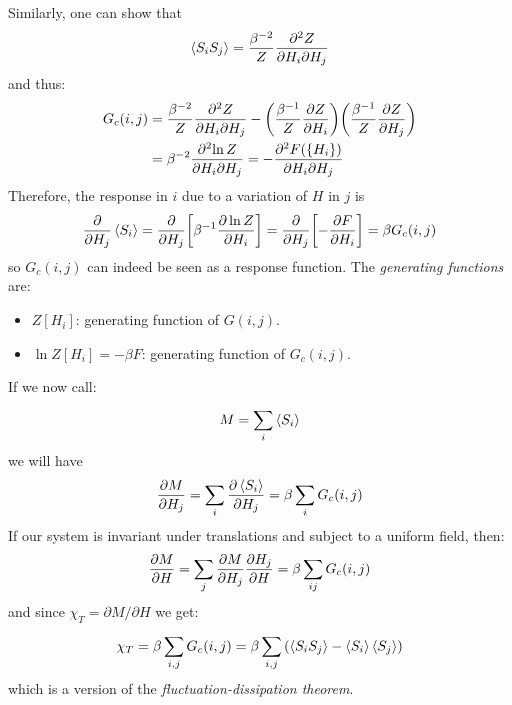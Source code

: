\documentclass[../../Main/Main.tex]{subfiles}
\begin{document}
Similarly, one can show that
\begin{equation}
  \expval{S_i S_j} = \frac{\beta ^{-2}}{Z} \frac{\partial^2{Z} }{\partial{H_i} \partial{H_j}  }
\end{equation}
and thus:
\begin{equation}
\begin{split}
  G_c (i,j) & = \frac{\beta ^{-2}}{Z}  \frac{\partial^2{Z} }{\partial{H_i} \partial{H_j}  }
  - \qty(\frac{\beta ^{-1}}{Z} \pdv{Z}{H_i} ) \qty(\frac{\beta ^{-1}}{Z} \pdv{Z}{H_j} ) \\
  & = \beta ^{-2} \frac{\partial^2{\ln{Z} } }{\partial{H_i} \partial{H_j}  }
  = - \frac{\partial^2{F(\{ H_i \}  )} }{\partial{H_i} \partial{H_j}  }
\end{split}
\end{equation}
Therefore, the response in \( i \) due to a variation of \( H \) in \( j \) is
  \begin{equation*}
    \pdv{}{H_j} \expval{S_i} = \pdv{}{H_j} \qty[\beta ^{-1} \pdv{\ln{Z} }{H_i} ]  =\pdv{}{H_j} \qty[-\pdv{F}{H_i} ] =  \beta G_c (i,j)
  \end{equation*}
  so \( G_c (i,j) \) can indeed be seen as a response function.
The \emph{generating functions} are:
\begin{itemize}
\item \( Z[H_i] \): generating function of \( G(i,j) \).
\item \( \ln{Z[H_i]} = - \beta F  \): generating function of \( G_c (i,j) \).
\end{itemize}
 If we now call:
\begin{equation*}
  M = \sum_{i}^{}  \expval{S_i}
\end{equation*}
we will have
\begin{equation*}
  \pdv{M}{H_j} = \sum_{i}^{} \pdv{\expval{S_i} }{H_j} = \beta  \sum_{i}^{} G_c (i,j)
\end{equation*}
If our system is invariant under translations and subject to a uniform field, then:
\begin{equation*}
  \pdv{M}{H} = \sum_{j}^{} \pdv{M}{H_j} \pdv{H_j}{H}
  =  \beta \sum_{ij}^{} G_c (i,j)
\end{equation*}
and since  \( \chi _{T}=\partial M/\partial H \) we get:
\begin{equation}
  \chi _T = \beta \sum_{i,j}^{} G_c (i,j)
  = \beta \sum_{i,j}^{} \qty(  \expval{S_i S_j} - \expval{S_i} \expval{S_j}  )
\end{equation}
which is a version of the \emph{fluctuation-dissipation theorem}.
\end{document}
